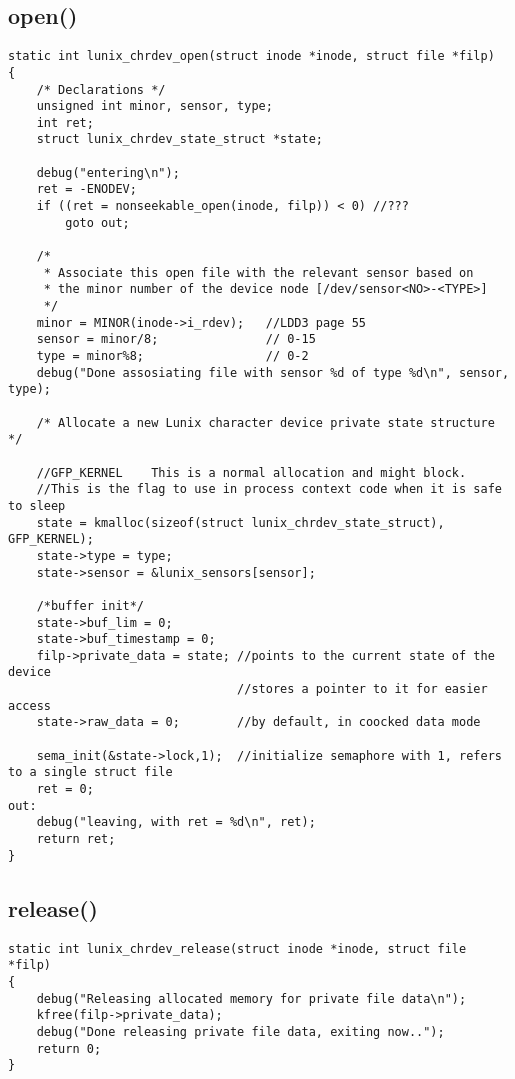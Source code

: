 \documentclass[a4paper]{article}
\begin{document}
\subsection*{open()}
\label{sec:open}
\begin{lstlisting}[style=CStyle]
static int lunix_chrdev_open(struct inode *inode, struct file *filp)
{
	/* Declarations */
    unsigned int minor, sensor, type;
    int ret;
    struct lunix_chrdev_state_struct *state;

	debug("entering\n");
	ret = -ENODEV;
	if ((ret = nonseekable_open(inode, filp)) < 0) //???
		goto out;

	/*
	 * Associate this open file with the relevant sensor based on
	 * the minor number of the device node [/dev/sensor<NO>-<TYPE>]
	 */
    minor = MINOR(inode->i_rdev);   //LDD3 page 55
    sensor = minor/8;               // 0-15
    type = minor%8;                 // 0-2
    debug("Done assosiating file with sensor %d of type %d\n", sensor, type);

	/* Allocate a new Lunix character device private state structure */

    //GFP_KERNEL	This is a normal allocation and might block.
    //This is the flag to use in process context code when it is safe to sleep
    state = kmalloc(sizeof(struct lunix_chrdev_state_struct), GFP_KERNEL);
    state->type = type;
    state->sensor = &lunix_sensors[sensor];

    /*buffer init*/
    state->buf_lim = 0;
    state->buf_timestamp = 0;
    filp->private_data = state; //points to the current state of the device
                                //stores a pointer to it for easier access
    state->raw_data = 0;        //by default, in coocked data mode

    sema_init(&state->lock,1);  //initialize semaphore with 1, refers to a single struct file
    ret = 0;
out:
	debug("leaving, with ret = %d\n", ret);
	return ret;
}
\end{lstlisting}

\subsection*{release()}
\label{sec:release}
\begin{lstlisting}[style=CStyle]
static int lunix_chrdev_release(struct inode *inode, struct file *filp)
{
    debug("Releasing allocated memory for private file data\n");
    kfree(filp->private_data);
    debug("Done releasing private file data, exiting now..");
	return 0;
}
\end{lstlisting}
\end{document}
